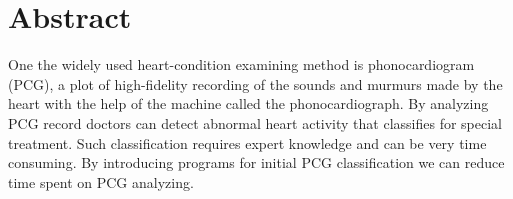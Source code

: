 \documentclass[10pt,a4paper]{article}
\begin{document}
\section{Abstract}
One the widely used heart-condition examining method is phonocardiogram (PCG), a plot of high-fidelity recording of the sounds and murmurs made by the heart with the help of the machine called the phonocardiograph. By analyzing PCG record doctors can detect abnormal heart activity that classifies for special treatment. Such classification requires expert knowledge and can be very time consuming. By introducing programs for initial PCG classification we can reduce time spent on PCG analyzing. 

\end{document}
